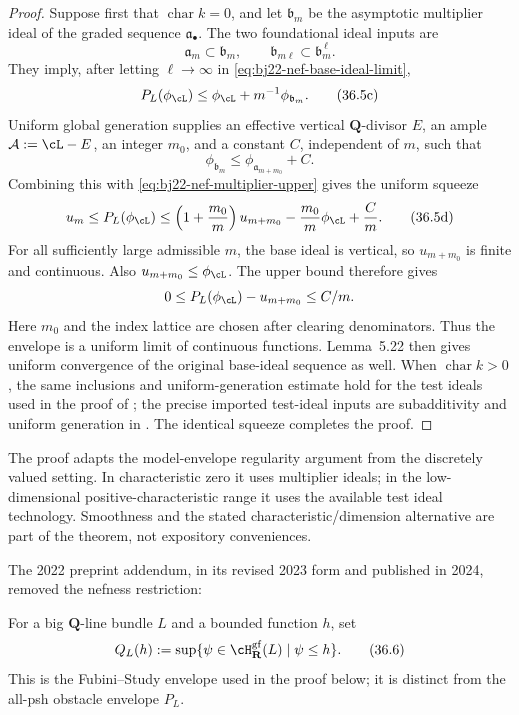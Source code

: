 \begin{proof}
Suppose first that $\operatorname{char}k=0$, and let
$\mathfrak b_m$ be the asymptotic multiplier ideal of the graded sequence
$\mathfrak a_\bullet$.  The two foundational ideal inputs are
\[
 \mathfrak a_m\subset\mathfrak b_m,
 \qquad
 \mathfrak b_{m\ell}\subset\mathfrak b_m^{\,\ell}.
\tag{36.5b}\label{eq:bj22-nef-multiplier-inclusions}
\]
They imply, after letting $\ell\to\infty$ in
\eqref{eq:bj22-nef-base-ideal-limit},
\[
 P_L(\phi_{\cL})
 \leq \phi_{\cL}+m^{-1}\phi_{\mathfrak b_m}.
\tag{36.5c}\label{eq:bj22-nef-multiplier-upper}
\]
Uniform global generation supplies an effective vertical
$\mathbf Q$-divisor $E$, an ample
$\mathcal A:=\cL-E$, an integer $m_0$, and a constant $C$, independent of
$m$, such that
\[
 \phi_{\mathfrak b_m}\leq
 \phi_{\mathfrak a_{m+m_0}}+C.
\]
Combining this with \eqref{eq:bj22-nef-multiplier-upper} gives the uniform
squeeze
\[
 u_m\leq P_L(\phi_{\cL})
 \leq \left(1+\frac{m_0}{m}\right)u_{m+m_0}
      -\frac{m_0}{m}\phi_{\cL}+\frac Cm.
\tag{36.5d}\label{eq:bj22-nef-uniform-squeeze}
\]
For all sufficiently large admissible $m$, the base ideal is vertical,
so $u_{m+m_0}$ is finite and continuous. Also
$u_{m+m_0}\leq\phi_{\cL}$. The upper bound therefore gives
\[
 0\leq P_L(\phi_{\cL})-u_{m+m_0}\leq C/m.
\]
Here $m_0$ and the index lattice are chosen after clearing denominators.
Thus the envelope is a uniform limit of continuous functions. Lemma~5.22
then gives uniform convergence of the original base-ideal sequence as well.  When $\operatorname{char}k>0$, the same inclusions and
uniform-generation estimate hold for the test ideals used in the proof of
\cite[Theorem~5.20]{BJ22}; the precise imported test-ideal inputs are
subadditivity and uniform generation in
\cite[\S4 and Theorem~4.6]{GJKM19}.  The identical squeeze completes the
proof.
\end{proof}

The proof adapts the model-envelope regularity argument from the discretely
valued setting.  In characteristic zero it uses multiplier ideals; in the
low-dimensional positive-characteristic range it uses the available test
ideal technology.  Smoothness and the stated characteristic/dimension
alternative are part of the theorem, not expository conveniences.

The 2022 preprint addendum, in its revised 2023 form and published in 2024,
removed the nefness restriction:

For a big $\mathbf Q$-line bundle $L$ and a bounded function $h$, set
\[
 Q_L(h):=\sup\{\psi\in\cH^{\mathrm{gf}}_{\mathbf R}(L)\mid\psi\leq h\}.
\tag{36.6}\label{eq:fs-envelope}
\]
This is the Fubini--Study envelope used in the proof below; it is distinct
from the all-psh obstacle envelope $P_L$.

